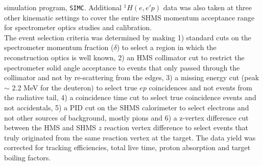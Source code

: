 simulation program, \texttt{SIMC}. Additional $^{1}H(e,e'p)$ data was also taken at three other kinematic settings to cover the entire SHMS momentum acceptance range for spectrometer optics studies and
calibration. \\
\indent The event selection criteria was determined by making 1) standard cuts on the spectrometer momentum fraction ($\delta$) to select a region in which the reconstruction optics
is well known, 2) an HMS collimator cut to restrict the spectrometer solid angle acceptance to events that only passed through the collimator and not by re-scattering from the edges, 3) a missing
energy cut (peak $\sim$ 2.2 MeV for the deuteron) to select true $ep$ coincidences and not events from the radiative tail, 4) a coincidence time cut to select true coincidence events and not accidentals,  5) a PID cut on the
SHMS calorimeter to select electrons and not other sources of background, mostly pions and 6) a z-vertex difference cut between the HMS and SHMS $z$ reaction vertex difference to select events that truly
originated from the same reaction vertex at the target.
\indent The data yield was corrected for tracking efficiencies, total live time, proton absorption and target boiling factors.


